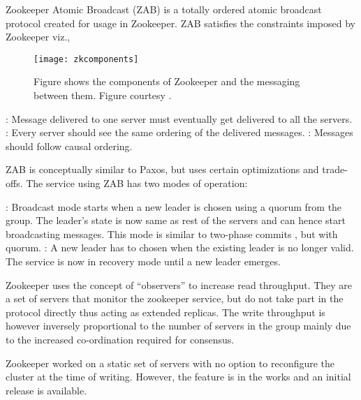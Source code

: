 Zookeeper Atomic Broadcast (ZAB) 
\citep{Reed:2008:STO:1529974.1529978, JunqueiraRS11} is a 
totally ordered atomic broadcast protocol created for usage in Zookeeper. ZAB
satisfies the constraints imposed by Zookeeper viz.,

\begin{figure}
  \texttt{[image: zkcomponents]}
  \caption[Zookeeper Components]{%
    Figure shows the components of Zookeeper and the messaging between them.
    Figure courtesy \citet{zookeeper}.}
  \label{figure:megastore}
\end{figure}


\begin{itemize}
    : Message delivered to one server must eventually
    get delivered to all the servers.
    : Every server should see the same ordering of the 
    delivered messages.
    : Messages should follow causal%
    ordering.
\end{itemize}

ZAB is conceptually similar to Paxos, but uses certain optimizations and 
trade-offs. The service using ZAB has two modes of operation:

\begin{itemize}
    : Broadcast mode starts when a new leader is chosen
    using a quorum from the group. The leader's state is now same as rest of
    the servers and can hence start broadcasting messages.
    This mode is similar to two-phase commits \citep{Gray78}, but with quorum.
    : A new leader has to chosen when the existing leader 
    is no longer valid. The service is now in recovery mode until a new leader
    emerges.
\end{itemize}

Zookeeper uses the concept of ``observers'' to increase read throughput. They 
are a set of servers that monitor the zookeeper service, but do not take part
in the protocol directly thus acting as extended replicas. The write throughput
is however inversely proportional to the number of servers in the group mainly
due to the increased co-ordination required for consensus.

Zookeeper worked on a static set of servers with no option to reconfigure the
cluster at the time of writing. However, the feature is in the works 
\citep{zab2012}and an initial release is available.

